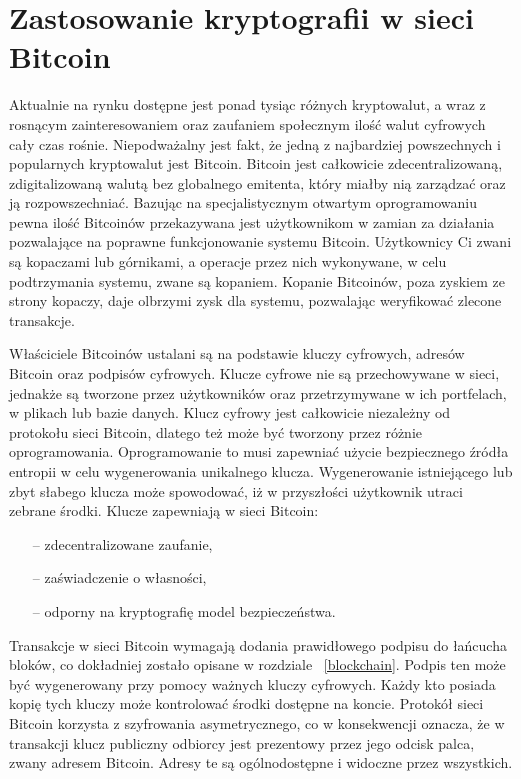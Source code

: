 \documentclass[12pt, twoside, final, openany]{mgr}
\begin{document}
\section{Zastosowanie kryptografii w sieci Bitcoin} \label{sec:zastosowanieKryptografii}
\indent Aktualnie na rynku dostępne jest ponad tysiąc różnych kryptowalut, a wraz z rosnącym zainteresowaniem oraz zaufaniem społecznym ilość walut cyfrowych cały czas rośnie\cite{Zcoinmarketcap}. Niepodważalny jest fakt, że jedną z najbardziej powszechnych i popularnych kryptowalut jest Bitcoin. Bitcoin jest całkowicie zdecentralizowaną, zdigitalizowaną walutą bez globalnego emitenta, który miałby nią zarządzać oraz ją rozpowszechniać. Bazując na specjalistycznym otwartym oprogramowaniu pewna ilość Bitcoinów przekazywana jest użytkownikom w zamian za działania pozwalające na poprawne funkcjonowanie systemu Bitcoin. Użytkownicy Ci zwani są kopaczami lub górnikami, a operacje przez nich wykonywane, w celu podtrzymania systemu, zwane są kopaniem. Kopanie Bitcoinów, poza zyskiem ze strony kopaczy, daje olbrzymi zysk dla systemu, pozwalając weryfikować zlecone transakcje.

\indent Właściciele Bitcoinów ustalani są na podstawie kluczy cyfrowych, adresów Bitcoin oraz podpisów cyfrowych. Klucze cyfrowe nie są przechowywane w sieci, jednakże są tworzone przez użytkowników oraz przetrzymywane w ich portfelach, w plikach lub bazie danych. Klucz cyfrowy jest całkowicie niezależny od protokołu sieci Bitcoin, dlatego też może być tworzony przez różnie oprogramowania. Oprogramowanie to musi zapewniać użycie bezpiecznego źródła entropii w celu wygenerowania unikalnego klucza\cite{Mastering}. Wygenerowanie istniejącego lub zbyt słabego klucza może spowodować, iż w przyszłości użytkownik utraci zebrane środki. Klucze zapewniają w sieci Bitcoin:
\begin{itemize}
\item[--] zdecentralizowane zaufanie,
\item[--] zaświadczenie o własności,
\item[--] odporny na kryptografię model bezpieczeństwa.
\end{itemize}
Transakcje w sieci Bitcoin wymagają dodania prawidłowego podpisu do łańcucha bloków, co dokładniej zostało opisane w rozdziale ~\ref{blockchain}. Podpis ten może być wygenerowany przy pomocy ważnych kluczy cyfrowych. Każdy kto posiada kopię tych kluczy może kontrolować środki dostępne na koncie. Protokół sieci Bitcoin korzysta z szyfrowania asymetrycznego, co w konsekwencji oznacza, że w transakcji klucz publiczny odbiorcy jest prezentowy przez jego odcisk palca, zwany adresem Bitcoin. Adresy te są ogólnodostępne i widoczne przez wszystkich\cite{blockchaininfo}. 
\end{document}

